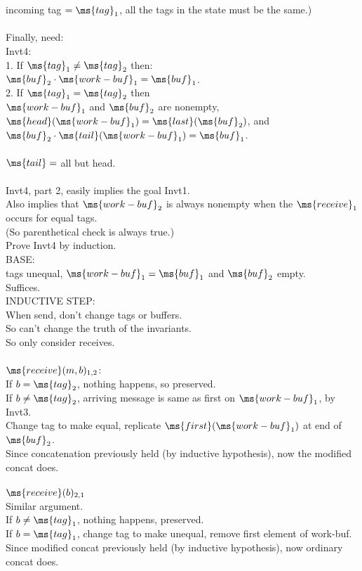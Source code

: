 incoming tag $= \ms{tag}_1$, all the tags in the state must be the same.) \\
\\
Finally, need: \\
Invt4: \\
1. If $\ms{tag}_1 \neq \ms{tag}_2$ then: \\
$\ms{buf}_2 \cdot \ms{work-buf}_1 = \ms{buf}_1$. \\
2. If $\ms{tag}_1 = \ms{tag}_2$ then \\
$\ms{work-buf}_1$ and $\ms{buf}_2$ are nonempty, \\
$\ms{head}(\ms{work-buf}_1) = \ms{last}(\ms{buf}_2)$, and \\
$\ms{buf}_2 \cdot \ms{tail}(\ms{work-buf}_1) = \ms{buf}_1$. \\
\\
$\ms{tail} =$ all but head. \\
\\
Invt4, part 2, easily implies the goal Invt1. \\
Also implies that $\ms{work-buf}_2$ is always nonempty when the
$\ms{receive}_1$ occurs for equal tags. \\
(So parenthetical check is always true.)
\\
Prove Invt4 by induction. \\
BASE:  \\
tags unequal, $\ms{work-buf}_1 = \ms{buf}_1$ and $\ms{buf}_2$
empty. \\
Suffices. \\
INDUCTIVE STEP: \\
When send, don't change tags or buffers. \\
So can't change the truth of the invariants. \\
So only consider receives.\\
\\
$\ms{receive}(m,b)_{1,2}$: \\
If $b = \ms{tag}_2$, nothing happens, so preserved. \\
If $b \neq \ms{tag}_2$, arriving message is same as first on
$\ms{work-buf}_1$, by Invt3. \\
Change tag to make equal, replicate $\ms{first}(\ms{work-buf}_1)$ at
end of $\ms{buf}_2$. \\
Since concatenation previously held (by inductive hypothesis),
now the modified concat does. \\
\\
$\ms{receive}(b)_{2,1}$ \\
Similar argument. \\
If $b \neq \ms{tag}_1$, nothing happens, preserved. \\
If $b = \ms{tag}_1$, change tag to make unequal, remove first element
of work-buf. \\
Since modified concat previously held (by inductive hypothesis), now
ordinary concat does. 

\endinput
